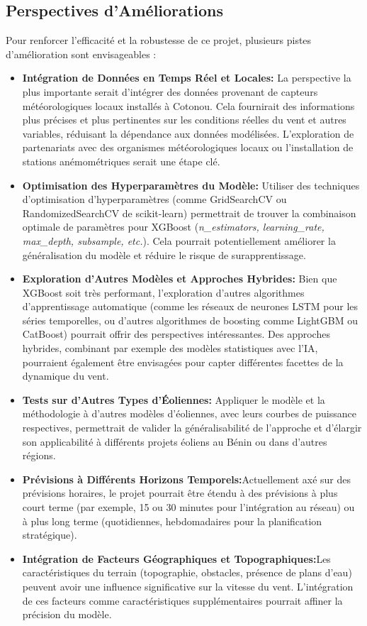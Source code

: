\documentclass[12pt]{article}
\begin{document}
\subsection{Perspectives d'Améliorations}
Pour renforcer l'efficacité et la robustesse de ce projet, plusieurs pistes d'amélioration sont envisageables :
\begin{itemize}[label=$\color{blue}\surd$]
	\item \textbf{Intégration de Données en Temps Réel et Locales:} La perspective la plus importante serait d'intégrer des données provenant de capteurs météorologiques locaux installés à Cotonou. Cela fournirait des informations plus précises et plus pertinentes sur les conditions réelles du vent et autres variables, réduisant la dépendance aux données modélisées. L'exploration de partenariats avec des organismes météorologiques locaux ou l'installation de stations anémométriques serait une étape clé.
	\item \textbf{Optimisation des Hyperparamètres du Modèle:} Utiliser des techniques d'optimisation d'hyperparamètres (comme GridSearchCV ou RandomizedSearchCV de scikit-learn) permettrait de trouver la combinaison optimale de paramètres pour XGBoost (\textit{n\_estimators, learning\_rate, max\_depth, subsample, etc.}). Cela pourrait potentiellement améliorer la généralisation du modèle et réduire le risque de surapprentissage.
	\item \textbf{Exploration d'Autres Modèles et Approches Hybrides:}
	Bien que XGBoost soit très performant, l'exploration d'autres algorithmes d'apprentissage automatique (comme les réseaux de neurones LSTM pour les séries temporelles, ou d'autres algorithmes de boosting comme LightGBM ou CatBoost) pourrait offrir des perspectives intéressantes. Des approches hybrides, combinant par exemple des modèles statistiques avec l'IA, pourraient également être envisagées pour capter différentes facettes de la dynamique du vent.
	\item \textbf{Tests sur d'Autres Types d'Éoliennes:}
	Appliquer le modèle et la méthodologie à d'autres modèles d'éoliennes, avec leurs courbes de puissance respectives, permettrait de valider la généralisabilité de l'approche et d'élargir son applicabilité à différents projets éoliens au Bénin ou dans d'autres régions.
	\item \textbf{Prévisions à Différents Horizons Temporels:}Actuellement axé sur des prévisions horaires, le projet pourrait être étendu à des prévisions à plus court terme (par exemple, 15 ou 30 minutes pour l'intégration au réseau) ou à plus long terme (quotidiennes, hebdomadaires pour la planification stratégique).
	\item \textbf{Intégration de Facteurs Géographiques et Topographiques:}Les caractéristiques du terrain (topographie, obstacles, présence de plans d'eau) peuvent avoir une influence significative sur la vitesse du vent. L'intégration de ces facteurs comme caractéristiques supplémentaires pourrait affiner la précision du modèle.
\end{itemize}
\end{document}
